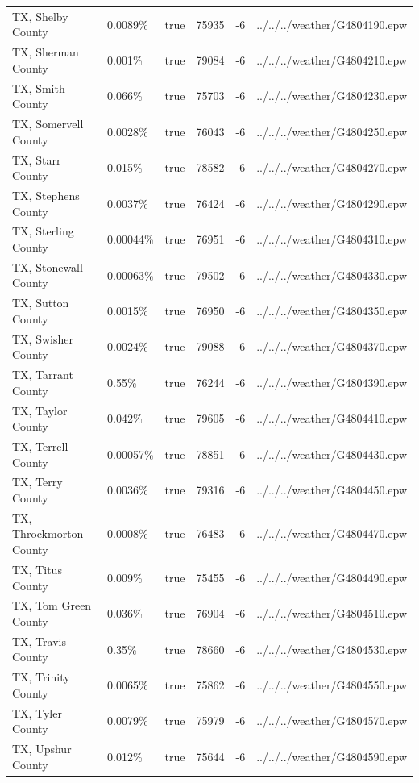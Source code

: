 \begin{longtable}[]{@{}llllll@{}}
TX, Shelby County & 0.0089\% & true & 75935 & -6 &
../../../weather/G4804190.epw \\
TX, Sherman County & 0.001\% & true & 79084 & -6 &
../../../weather/G4804210.epw \\
TX, Smith County & 0.066\% & true & 75703 & -6 &
../../../weather/G4804230.epw \\
TX, Somervell County & 0.0028\% & true & 76043 & -6 &
../../../weather/G4804250.epw \\
TX, Starr County & 0.015\% & true & 78582 & -6 &
../../../weather/G4804270.epw \\
TX, Stephens County & 0.0037\% & true & 76424 & -6 &
../../../weather/G4804290.epw \\
TX, Sterling County & 0.00044\% & true & 76951 & -6 &
../../../weather/G4804310.epw \\
TX, Stonewall County & 0.00063\% & true & 79502 & -6 &
../../../weather/G4804330.epw \\
TX, Sutton County & 0.0015\% & true & 76950 & -6 &
../../../weather/G4804350.epw \\
TX, Swisher County & 0.0024\% & true & 79088 & -6 &
../../../weather/G4804370.epw \\
TX, Tarrant County & 0.55\% & true & 76244 & -6 &
../../../weather/G4804390.epw \\
TX, Taylor County & 0.042\% & true & 79605 & -6 &
../../../weather/G4804410.epw \\
TX, Terrell County & 0.00057\% & true & 78851 & -6 &
../../../weather/G4804430.epw \\
TX, Terry County & 0.0036\% & true & 79316 & -6 &
../../../weather/G4804450.epw \\
TX, Throckmorton County & 0.0008\% & true & 76483 & -6 &
../../../weather/G4804470.epw \\
TX, Titus County & 0.009\% & true & 75455 & -6 &
../../../weather/G4804490.epw \\
TX, Tom Green County & 0.036\% & true & 76904 & -6 &
../../../weather/G4804510.epw \\
TX, Travis County & 0.35\% & true & 78660 & -6 &
../../../weather/G4804530.epw \\
TX, Trinity County & 0.0065\% & true & 75862 & -6 &
../../../weather/G4804550.epw \\
TX, Tyler County & 0.0079\% & true & 75979 & -6 &
../../../weather/G4804570.epw \\
TX, Upshur County & 0.012\% & true & 75644 & -6 &
../../../weather/G4804590.epw \\

\end{longtable}
